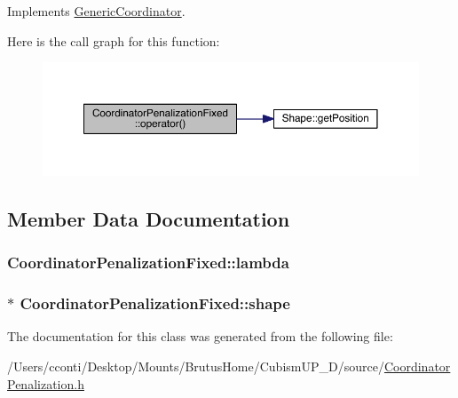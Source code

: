 Implements \hyperlink{class_generic_coordinator_a984696fef63daf7253b87ce21cce3f94}{Generic\+Coordinator}.



Here is the call graph for this function\+:\nopagebreak
\begin{figure}[H]
\begin{center}
\leavevmode
\includegraphics[width=350pt]{d6/d40/class_coordinator_penalization_fixed_adb344c7e7ded7b7e8f4d948c38d0c980_cgraph}
\end{center}
\end{figure}




\subsection{Member Data Documentation}
\hypertarget{class_coordinator_penalization_fixed_a5e9ee0336487fa3980dbad77f51c50ba}{}
\subsubsection[{lambda}]{ Coordinator\+Penalization\+Fixed\+::lambda\hspace{0.3cm}{\ttfamily [protected]}}\label{class_coordinator_penalization_fixed_a5e9ee0336487fa3980dbad77f51c50ba}
\hypertarget{class_coordinator_penalization_fixed_a548e655ec26679bdb0f1c2d12f039f1f}{}
\subsubsection[{shape}]{$\ast$ Coordinator\+Penalization\+Fixed\+::shape\hspace{0.3cm}{\ttfamily [protected]}}\label{class_coordinator_penalization_fixed_a548e655ec26679bdb0f1c2d12f039f1f}


The documentation for this class was generated from the following file\+:\begin{DoxyCompactItemize}
\item 
/\+Users/cconti/\+Desktop/\+Mounts/\+Brutus\+Home/\+Cubism\+U\+P\+\_\+D/source/\hyperlink{_coordinator_penalization_8h}{Coordinator\+Penalization.\+h}\end{DoxyCompactItemize}

